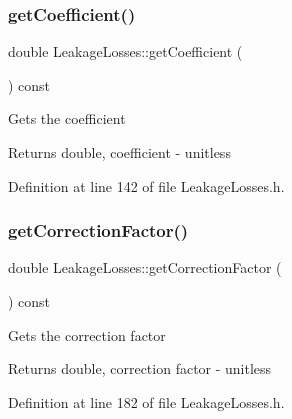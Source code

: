\mbox{\label{class_leakage_losses_a7f70af7175574e0c4447a322586ac01e}} 
\subsubsection{\texorpdfstring{get\+Coefficient()}{getCoefficient()}\hspace{0.1cm}{\footnotesize\ttfamily [3/3]}}
{\footnotesize\ttfamily double Leakage\+Losses\+::get\+Coefficient (\begin{DoxyParamCaption}{ }\end{DoxyParamCaption}) const\hspace{0.3cm}{\ttfamily [inline]}}

Gets the coefficient

\begin{DoxyReturn}{Returns}
double, coefficient -\/ unitless 
\end{DoxyReturn}


Definition at line 142 of file Leakage\+Losses.\+h.

\mbox{\label{class_leakage_losses_ad4f289a7490cd3fd4dfc4099fc4ad562}} 
\subsubsection{\texorpdfstring{get\+Correction\+Factor()}{getCorrectionFactor()}\hspace{0.1cm}{\footnotesize\ttfamily [1/3]}}
{\footnotesize\ttfamily double Leakage\+Losses\+::get\+Correction\+Factor (\begin{DoxyParamCaption}{ }\end{DoxyParamCaption}) const\hspace{0.3cm}{\ttfamily [inline]}}

Gets the correction factor

\begin{DoxyReturn}{Returns}
double, correction factor -\/ unitless 
\end{DoxyReturn}


Definition at line 182 of file Leakage\+Losses.\+h.

